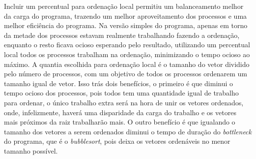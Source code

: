 Incluir um percentual para ordenação local permitiu um balanceamento melhor da carga do programa, trazendo um melhor aproveitamento dos processos e uma melhor eficiência do programa. Na versão simples do programa, apenas em torno da metade dos processos estavam realmente trabalhando fazendo a ordenação, enquanto o resto ficava ocioso esperando pelo resultado, utilizando um percentual local todos os processos trabalham na ordenação, minimizando o tempo ocioso ao máximo. A quantia escolhida para ordenação local é o tamanho do vetor dividido pelo número de processos, com um objetivo de todos os processos ordenarem um tamanho igual de vetor. Isso trás dois benefícios, o primeiro é que diminui o tempo ocioso dos processos, pois todos tem uma quantidade igual de trabalho para ordenar, o único trabalho extra será na hora de unir os vetores ordenados, onde, infelizmente, haverá uma disparidade da carga do trabalho e os vetores mais próximos da raiz trabalharão mais. O outro benefício é que igualando o tamanho dos vetores a serem ordenados diminui o tempo de duração do \emph{bottleneck} do programa, que é o \emph{bubblesort}, pois deixa os vetores ordenáveis no menor tamanho possível.